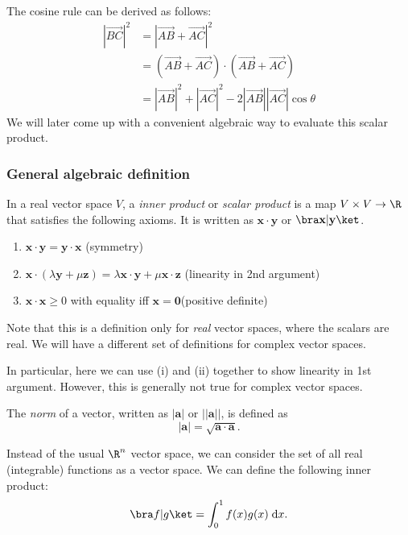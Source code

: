 \documentclass[a4paper]{article}
\begin{document}
The cosine rule can be derived as follows:
\begin{align*}
  |\overrightarrow{BC}|^2 &= |\overrightarrow{AB} + \overrightarrow{AC}|^2\\
  &= (\overrightarrow{AB} + \overrightarrow{AC})\cdot (\overrightarrow{AB} + \overrightarrow{AC})\\
  &= |\overrightarrow{AB}|^2 + |\overrightarrow{AC}|^2 - 2|\overrightarrow{AB}||\overrightarrow{AC}|\cos\theta
\end{align*}
We will later come up with a convenient algebraic way to evaluate this scalar product.

\subsubsection{General algebraic definition}
\begin{defi}
  In a real vector space $V$, a \emph{inner product} or \emph{scalar product} is a map $V\times V\to \R$ that satisfies the following axioms. It is written as $\mathbf{x\cdot y}$ or $\bra\mathbf{x|y}\ket$.
  \begin{enumerate}
    \item $\mathbf{x\cdot y = y\cdot x}$ \hfill (symmetry)
    \item $\mathbf{x}\cdot (\lambda\mathbf{y} + \mu\mathbf{z}) = \lambda\mathbf{x\cdot y} + \mu\mathbf{x\cdot z}$ \hfill (linearity in 2nd argument)
    \item $\mathbf{x\cdot x}\geq 0$ with equality iff $\mathbf{x = 0}$\hfill (positive definite)
  \end{enumerate}
\end{defi}
Note that this is a definition only for \emph{real} vector spaces, where the scalars are real. We will have a different set of definitions for complex vector spaces.

In particular, here we can use (i) and (ii) together to show linearity in 1st argument. However, this is generally not true for complex vector spaces.

\begin{defi}
  The \emph{norm} of a vector, written as $|\mathbf{a}|$ or $||\mathbf{a}||$, is defined as
  \[
    |\mathbf{a}| = \sqrt{\mathbf{a\cdot a}}.
  \]
\end{defi}

\begin{eg}
  Instead of the usual $\R^n$ vector space, we can consider the set of all real (integrable) functions as a vector space. We can define the following inner product:
  \[
    \bra f|g\ket = \int_0^1f(x)g(x)\;\mathrm{d} x.
  \]
\end{eg}
\end{document}
